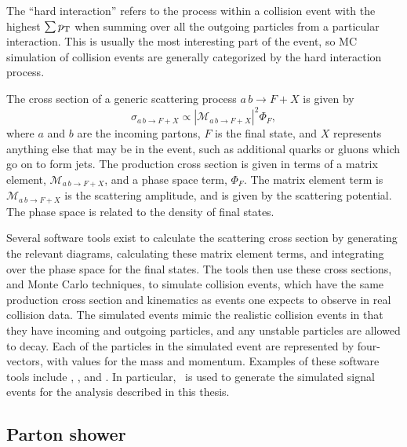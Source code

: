 The ``hard interaction'' refers to the process within a collision event
with the highest $\sum p_{\mathrm{T}}$ when summing over all the outgoing particles
from a particular interaction.
This is usually the most interesting part of the event, so MC simulation of
collision events are generally categorized by the hard interaction process.

The cross section of a generic scattering process $a\,b \to F+X$ is given by
\begin{equation}
  \sigma_{a\,b \to F+X} \propto
  \left|\mathcal{M}_{a\,b \to F+X}\right|^2 \Phi_{F},
\end{equation}
where $a$ and $b$ are the incoming partons, $F$ is the final state, and $X$
represents anything else that may be in the event, such as additional quarks or
gluons which go on to form jets.
The production cross section is given in terms of a matrix
element, $\mathcal{M}_{a\,b \to F+X}$, and a phase space term, $\Phi_F$.
The matrix element term is $\mathcal{M}_{a\,b \to F+X}$ is the scattering
amplitude, and is given by the scattering potential.
The phase space is related to the density of final states.

Several software tools exist to calculate the scattering cross section by
generating the relevant diagrams, calculating these matrix element terms,
and integrating over the phase space for the final states.
The tools then use these cross sections, and Monte Carlo techniques, to simulate
collision events, which have the same production cross section and kinematics
as events one expects to observe in real collision data.
The simulated events mimic the realistic collision events in that they have
incoming and outgoing particles, and any unstable particles are allowed to
decay.
Each of the particles in the simulated event are represented by four-vectors,
with values for the mass and momentum.
Examples of these software tools include \sherpa, \powheg, and \madgraph.
In particular, \madgraph\ is used to generate the simulated signal events for
the analysis described in this thesis.

\FloatBarrier
\subsection{Parton shower}
\label{sec:parton_shower}

